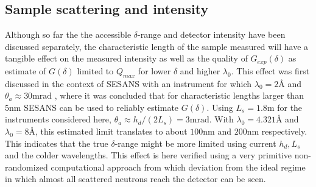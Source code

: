 \documentclass{article}
\begin{document}
\subsection{Sample scattering and intensity}
\label{c4.4}
Although so far the the accessible $\delta$-range and detector intensity have been discussed separately, the characteristic length of the sample measured will have a tangible effect on the measured intensity as well as the quality of $G_{exp}(\delta)$ as estimate of $G(\delta)$ limited to $Q_{max}$ for lower $\delta$ and higher $\lambda_0$. This effect was first discussed in the context of SESANS with an instrument for which $\lambda_0 = 2$Å and $\theta_a \approx 30\unit{\milli\radian}$ \cite{rekveldt1996}, where it was concluded that for characteristic lengths larger than $5\unit{\nano\meter}$ SESANS can be used to reliably estimate $G(\delta)$. Using $L_s = 1.8\unit\meter$ for the instruments considered here, $\theta_a \approx h_d / (2L_s) = 3\unit{\milli\radian}$. With $\lambda_0 = 4.321$Å and $\lambda_0 = 8$Å, this estimated limit translates to about $100 \unit{\nano\meter}$ and $200 \unit{\nano\meter}$ respectively. This indicates that the true $\delta$-range might be more limited using current $h_d,L_s$ and the colder wavelengths. This effect is here verified using a very primitive non-randomized computational approach from which deviation from the ideal regime in which almost all scattered neutrons reach the detector \cite{rekveldt1996} can be seen. 
\end{document}
